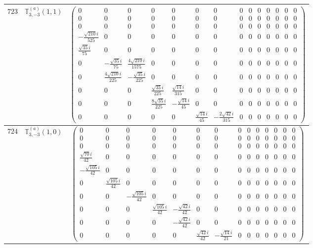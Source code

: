 \documentclass[fleqn,8pt,landscape]{jsarticle}
\begin{document}
\begin{center}
\begin{longtable}{ccc}
$ 723 $ & $ \mathbb{T}_{3,-3}^{(a)}(1,1) $ & $ \begin{pmatrix} 0 & 0 & 0 & 0 & 0 & 0 & 0 & 0 & 0 & 0 & 0 & 0 & 0 & 0 \\ 0 & 0 & 0 & 0 & 0 & 0 & 0 & 0 & 0 & 0 & 0 & 0 & 0 & 0 \\ 0 & 0 & 0 & 0 & 0 & 0 & 0 & 0 & 0 & 0 & 0 & 0 & 0 & 0 \\ - \frac{\sqrt{210} i}{525} & 0 & 0 & 0 & 0 & 0 & 0 & 0 & 0 & 0 & 0 & 0 & 0 & 0 \\ \frac{\sqrt{35} i}{75} & 0 & 0 & 0 & 0 & 0 & 0 & 0 & 0 & 0 & 0 & 0 & 0 & 0 \\ 0 & - \frac{\sqrt{35} i}{75} & \frac{4 \sqrt{210} i}{1575} & 0 & 0 & 0 & 0 & 0 & 0 & 0 & 0 & 0 & 0 & 0 \\ 0 & \frac{4 \sqrt{210} i}{225} & - \frac{\sqrt{35} i}{225} & 0 & 0 & 0 & 0 & 0 & 0 & 0 & 0 & 0 & 0 & 0 \\ 0 & 0 & 0 & \frac{\sqrt{35} i}{225} & \frac{\sqrt{14} i}{315} & 0 & 0 & 0 & 0 & 0 & 0 & 0 & 0 & 0 \\ 0 & 0 & 0 & \frac{8 \sqrt{35} i}{225} & - \frac{\sqrt{14} i}{45} & 0 & 0 & 0 & 0 & 0 & 0 & 0 & 0 & 0 \\ 0 & 0 & 0 & 0 & 0 & \frac{\sqrt{14} i}{45} & - \frac{2 \sqrt{42} i}{315} & 0 & 0 & 0 & 0 & 0 & 0 & 0 \end{pmatrix} $ \\ \hline
$ 724 $ & $ \mathbb{T}_{3,-3}^{(a)}(1,0) $ & $ \begin{pmatrix} 0 & 0 & 0 & 0 & 0 & 0 & 0 & 0 & 0 & 0 & 0 & 0 & 0 & 0 \\ 0 & 0 & 0 & 0 & 0 & 0 & 0 & 0 & 0 & 0 & 0 & 0 & 0 & 0 \\ 0 & 0 & 0 & 0 & 0 & 0 & 0 & 0 & 0 & 0 & 0 & 0 & 0 & 0 \\ \frac{\sqrt{70} i}{42} & 0 & 0 & 0 & 0 & 0 & 0 & 0 & 0 & 0 & 0 & 0 & 0 & 0 \\ - \frac{\sqrt{105} i}{42} & 0 & 0 & 0 & 0 & 0 & 0 & 0 & 0 & 0 & 0 & 0 & 0 & 0 \\ 0 & \frac{\sqrt{105} i}{42} & 0 & 0 & 0 & 0 & 0 & 0 & 0 & 0 & 0 & 0 & 0 & 0 \\ 0 & 0 & - \frac{\sqrt{105} i}{42} & 0 & 0 & 0 & 0 & 0 & 0 & 0 & 0 & 0 & 0 & 0 \\ 0 & 0 & 0 & \frac{\sqrt{105} i}{42} & - \frac{\sqrt{42} i}{42} & 0 & 0 & 0 & 0 & 0 & 0 & 0 & 0 & 0 \\ 0 & 0 & 0 & 0 & - \frac{\sqrt{42} i}{42} & 0 & 0 & 0 & 0 & 0 & 0 & 0 & 0 & 0 \\ 0 & 0 & 0 & 0 & 0 & \frac{\sqrt{42} i}{42} & - \frac{\sqrt{14} i}{21} & 0 & 0 & 0 & 0 & 0 & 0 & 0 \end{pmatrix} $ \\ \hline

\end{longtable}
\end{center}
\end{document}

